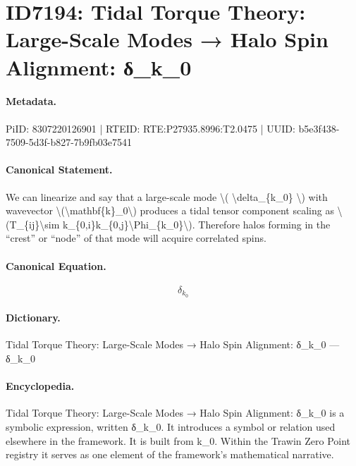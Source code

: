 \section*{ID7194: Tidal Torque Theory: Large-Scale Modes → Halo Spin Alignment: δ\_k\_0}
\paragraph{Metadata.}
PiID: 8307220126901 | RTEID: RTE:P27935.8996:T2.0475 | UUID: b5e3f438-7509-5d3f-b827-7b9fb03e7541

\paragraph{Canonical Statement.}
We can linearize and say that a large-scale mode \textbackslash{}( \textbackslash{}delta\_\{k\_0\} \textbackslash{}) with wavevector \textbackslash{}(\textbackslash{}mathbf\{k\}\_0\textbackslash{}) produces a tidal tensor component scaling as \textbackslash{}(T\_\{ij\}\textbackslash{}sim k\_\{0,i\}k\_\{0,j\}\textbackslash{}Phi\_\{k\_0\}\textbackslash{}). Therefore halos forming in the “crest” or “node” of that mode will acquire correlated spins.

\paragraph{Canonical Equation.}
\[
\delta_{k_0}
\]

\paragraph{Dictionary.}
Tidal Torque Theory: Large-Scale Modes → Halo Spin Alignment: δ\_k\_0 — δ\_k\_0

\paragraph{Encyclopedia.}
Tidal Torque Theory: Large-Scale Modes → Halo Spin Alignment: δ\_k\_0 is a symbolic expression, written δ\_k\_0. It introduces a symbol or relation used elsewhere in the framework. It is built from k\_0. Within the Trawin Zero Point registry it serves as one element of the framework's mathematical narrative.
